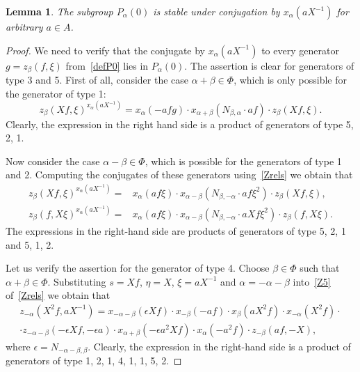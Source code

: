 \documentclass[oneside, 8pt]{amsart}
\newtheorem{lemma}{Lemma}
\theoremstyle{remark}
\theoremstyle{definition}
\numberwithin{equation}{section}
\begin{document}
\begin{lemma}\label{P0_conj} The subgroup $P_\alpha(0)$ is stable under conjugation by $x_\alpha(aX^{-1})$ for arbitrary $a\in A$. \end{lemma}
\begin{proof} We need to verify that the conjugate by $x_\alpha(aX^{-1})$ to every generator $g = z_\beta(f, \xi)$ from~\cref{defP0} lies in $P_\alpha(0)$. 
The assertion is clear for generators of type 3 and 5.
First of all, consider the case $\alpha + \beta \in \Phi$, which is only possible for the generator of type 1:
\begin{equation}\label{eq:Zconj1} z_{\beta}(Xf, \xi) ^ {x_{\alpha}(aX^{-1})} = x_{\alpha} (- afg) \cdot x_{\alpha+\beta} (N_{\beta, \alpha}\cdot af) \cdot z_{\beta}(Xf, \xi). \end{equation}
Clearly, the expression in the right hand side is a product of generators of type 5, 2, 1. 

Now consider the case $\alpha - \beta \in \Phi$, which is possible for the generators of type 1 and 2.
Computing the conjugates of these generators using~\cref{Zrels} we obtain that
\begin{align} z_{\beta}(Xf, \xi) ^ {x_{\alpha}(aX^{-1})} = &  x_{\alpha} (af\xi) \cdot x_{\alpha-\beta} (N_{\beta,-\alpha}\cdot af\xi^2) \cdot z_{\beta}(Xf, \xi), \label{eq:Zconj2} \\
z_{\beta}(f, X\xi) ^ {x_{\alpha}(aX^{-1})} = & x_{\alpha} (af\xi) \cdot x_{\alpha-\beta} (N_{\beta,-\alpha}\cdot aXf\xi^2) \cdot z_{\beta}(f, X\xi). \nonumber \end{align}
The expressions in the right-hand side are products of generators of type 5, 2, 1 and 5, 1, 2.

Let us verify the assertion for the generator of type 4.
Choose $\beta\in \Phi$ such that $\alpha+\beta \in \Phi$. 
Substituting $s = Xf$, $\eta = X$, $\xi = aX^{-1}$ and $\alpha = -\alpha - \beta$ into~\eqref{Z5} of~\cref{Zrels} we obtain that
\begin{multline} \label{eq:Zconj3} z_{-\alpha}(X^2f, aX^{-1}) = x_{-\alpha-\beta}(\epsilon Xf) \cdot x_{-\beta}(-af) \cdot x_{\beta}(aX^2 f) \cdot x_{-\alpha}(X^2f) \cdot \\
 \cdot z_{-\alpha-\beta}(-\epsilon Xf, -\epsilon a) \cdot x_{\alpha+\beta}(-\epsilon a^2 Xf) \cdot x_{\alpha}(- a^2 f) \cdot z_{-\beta}(a f, -X), \end{multline}
where $\epsilon = N_{-\alpha-\beta,\beta}$. 
Clearly, the expression in the right-hand side is a product of generators of type 1, 2, 1, 4, 1, 1, 5, 2. \end{proof}
\end{document}

